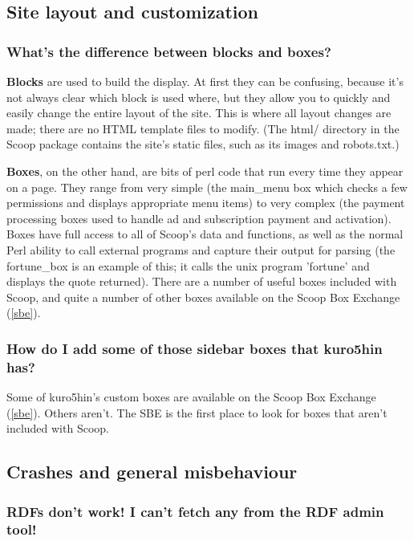 \subsection{Site layout and customization}

\subsubsection{What's the difference between blocks and boxes?}

{\bf Blocks} are used to build the display. At first they can be confusing, because it's not always clear which block is used where, but they allow you to quickly and easily change the entire layout of the site. This is where all layout changes are made; there are no HTML template files to modify. (The html/ directory in the Scoop package contains the site's static files, such as its images and robots.txt.)

{\bf Boxes}, on the other hand, are bits of perl code that run every time they appear on a page. They range from very simple (the main\_menu box which checks a few permissions and displays appropriate menu items) to very complex (the payment processing boxes used to handle ad and subscription payment and activation). Boxes have full access to all of Scoop's data and functions, as well as the normal Perl ability to call external programs and capture their output for parsing (the fortune\_box is an example of this; it calls the unix program 'fortune' and displays the quote returned). There are a number of useful boxes included with Scoop, and quite a number of other boxes available on the Scoop Box Exchange (\ref{sbe}).

\subsubsection{How do I add some of those sidebar boxes that kuro5hin has?}

Some of kuro5hin's custom boxes are available on the Scoop Box Exchange (\ref{sbe}). Others aren't. The SBE is the first place to look for boxes that aren't included with Scoop.

\subsection{Crashes and general misbehaviour}

\subsubsection{RDFs don't work! I can't fetch any from the RDF admin tool!}

